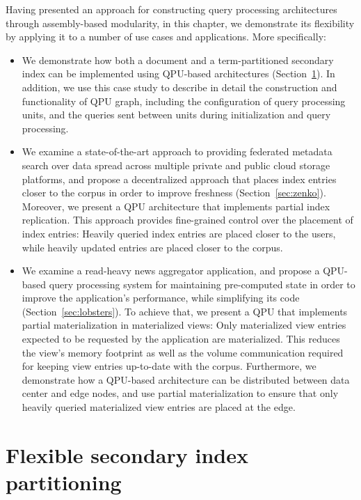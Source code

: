 Having presented an approach for constructing query processing architectures through assembly-based modularity,
in this chapter, we demonstrate its flexibility by applying it to a number of use cases and applications.
More specifically:

\begin{itemize}
  \item We demonstrate how both a document and a term-partitioned secondary
  index can be implemented using QPU-based architectures (Section~\ref{sec:cs_index_partitioning}).
  In addition,
  we use this case study to describe in detail the construction and functionality of QPU graph,
  including the configuration of query processing units, and the queries sent between units
  during initialization and query processing.

  \item We examine a state-of-the-art approach to providing federated metadata search over data spread
  across multiple private and public cloud storage platforms,
  and propose a decentralized approach that places index entries closer to the corpus in order to improve
  freshness (Section~\ref{sec:zenko}).
  Moreover, we present a QPU architecture that implements partial index replication.
  This approach provides fine-grained control over the placement of index entries:
  Heavily queried index entries are placed closer to the users,
  while heavily updated entries are placed closer to the corpus.

  \item We examine a read-heavy news aggregator application,
  and propose a QPU-based query processing system for maintaining pre-computed state in order to improve the application's performance,
  while simplifying its code (Section~\ref{sec:lobsters}).
  To achieve that, we present a QPU that implements partial materialization in materialized views:
  Only materialized view entries expected to be requested by the application are materialized.
  This reduces the view's memory footprint as well as the volume communication required for keeping view entries up-to-date
  with the corpus.
  Furthermore, we demonstrate how a QPU-based architecture can be distributed between data center and edge nodes,
  and use partial materialization to ensure that only heavily queried materialized view entries are placed at the edge.
\end{itemize}

\section{Flexible secondary index partitioning}
\label{sec:cs_index_partitioning}


